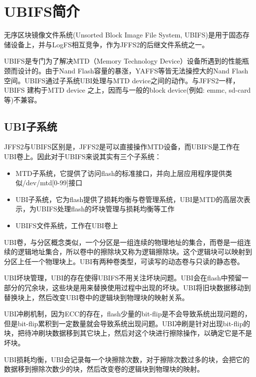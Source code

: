 \chapter{UBIFS简介}
无序区块镜像文件系统(Unsorted Block Image File System, UBIFS)是用于固态存储设备上，并与LogFS相互竞争，作为JFFS2的后继文件系统之一。

UBIFS是专门为了解决MTD（Memory Technology Device）设备所遇到的性能瓶颈而设计的。由于Nand Flash容量的暴涨，YAFFS等皆无法操控大的Nand Flash空间。UBIFS通过子系统UBI处理与MTD device之间的动作。与JFFS2一样，UBIFS 建构于MTD device 之上，因而与一般的block device(例如: emmc, sd-card等)不兼容。

\section{UBI子系统}
JFFS2与UBIFS区别是，JFFS2是可以直接操作MTD设备，而UBIFS是工作在UBI卷上。因此对于UBIFS来说其实有三个子系统：
\begin{itemize}
  \item MTD子系统，它提供了访问flash的标准接口，并向上层应用程序提供类似/dev/mtd[0-99]接口
  \item UBI子系统，它为flash提供了损耗均衡与卷管理系统，UBI是MTD的高层次表示，为UBIFS处理flash的坏块管理与损耗均衡等工作
  \item UBIFS文件系统，工作在UBI卷上
\end{itemize}

UBI卷，与分区概念类似，一个分区是一组连续的物理地址的集合，而卷是一组连续的逻辑地址集合，所以卷中的擦除块又称为逻辑擦除块。这个逻辑块可以映射到分区上任一个物理块上。UBI有两种卷类型，可读写的动态卷与只读的静态卷。

UBI坏块管理，UBI的存在使得UBIFS不用关注坏块问题。UBI会在flash中预留一部分的冗余块，这些块是用来替换使用过程中出现的坏块。UBI将旧块数据移动到替换块上，然后改变UBI卷中的逻辑块到物理块的映射关系。

UBI冲刷机制，因为ECC的存在，flash少量的bit-flip是不会导致系统出现问题的，但是bit-flip累积到一定数量就会导致系统出现问题。UBI冲刷是针对出现bit-flip的块，把待冲刷块数据移到其它块上，然后对这个块进行擦除操作，以确定它是不是坏块。

UBI损耗均衡，UBI会记录每一个块擦除次数，对于擦除次数过多的块，会把它的数据移到擦除次数少的块，然后改变卷的逻辑块到物理块的映射。


